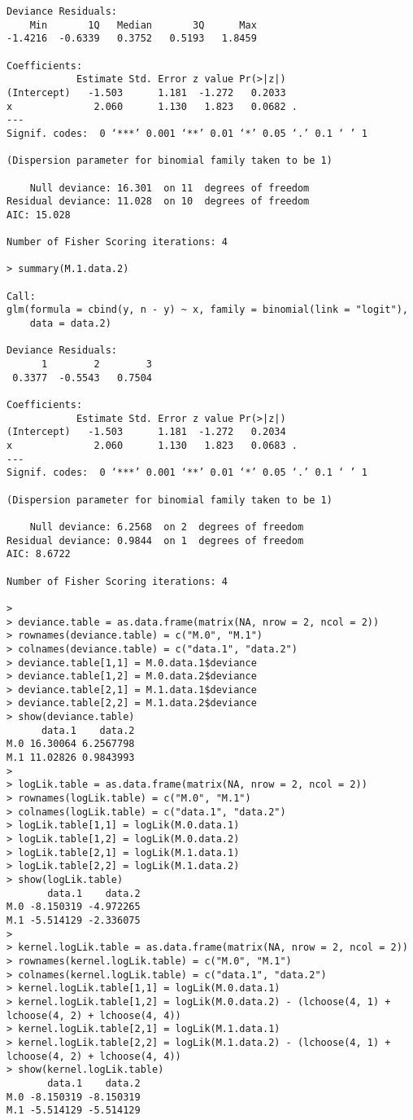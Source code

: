 \documentclass[a4paper]{article}
\begin{document}
\begin{lstlisting}
Deviance Residuals: 
    Min       1Q   Median       3Q      Max  
-1.4216  -0.6339   0.3752   0.5193   1.8459  

Coefficients:
            Estimate Std. Error z value Pr(>|z|)  
(Intercept)   -1.503      1.181  -1.272   0.2033  
x              2.060      1.130   1.823   0.0682 .
---
Signif. codes:  0 ‘***’ 0.001 ‘**’ 0.01 ‘*’ 0.05 ‘.’ 0.1 ‘ ’ 1

(Dispersion parameter for binomial family taken to be 1)

    Null deviance: 16.301  on 11  degrees of freedom
Residual deviance: 11.028  on 10  degrees of freedom
AIC: 15.028

Number of Fisher Scoring iterations: 4

> summary(M.1.data.2)

Call:
glm(formula = cbind(y, n - y) ~ x, family = binomial(link = "logit"), 
    data = data.2)

Deviance Residuals: 
      1        2        3  
 0.3377  -0.5543   0.7504  

Coefficients:
            Estimate Std. Error z value Pr(>|z|)  
(Intercept)   -1.503      1.181  -1.272   0.2034  
x              2.060      1.130   1.823   0.0683 .
---
Signif. codes:  0 ‘***’ 0.001 ‘**’ 0.01 ‘*’ 0.05 ‘.’ 0.1 ‘ ’ 1

(Dispersion parameter for binomial family taken to be 1)

    Null deviance: 6.2568  on 2  degrees of freedom
Residual deviance: 0.9844  on 1  degrees of freedom
AIC: 8.6722

Number of Fisher Scoring iterations: 4

> 
> deviance.table = as.data.frame(matrix(NA, nrow = 2, ncol = 2))
> rownames(deviance.table) = c("M.0", "M.1")
> colnames(deviance.table) = c("data.1", "data.2")
> deviance.table[1,1] = M.0.data.1$deviance
> deviance.table[1,2] = M.0.data.2$deviance
> deviance.table[2,1] = M.1.data.1$deviance
> deviance.table[2,2] = M.1.data.2$deviance
> show(deviance.table)
      data.1    data.2
M.0 16.30064 6.2567798
M.1 11.02826 0.9843993
> 
> logLik.table = as.data.frame(matrix(NA, nrow = 2, ncol = 2))
> rownames(logLik.table) = c("M.0", "M.1")
> colnames(logLik.table) = c("data.1", "data.2")
> logLik.table[1,1] = logLik(M.0.data.1)
> logLik.table[1,2] = logLik(M.0.data.2)
> logLik.table[2,1] = logLik(M.1.data.1) 
> logLik.table[2,2] = logLik(M.1.data.2)
> show(logLik.table)
       data.1    data.2
M.0 -8.150319 -4.972265
M.1 -5.514129 -2.336075
> 
> kernel.logLik.table = as.data.frame(matrix(NA, nrow = 2, ncol = 2))
> rownames(kernel.logLik.table) = c("M.0", "M.1")
> colnames(kernel.logLik.table) = c("data.1", "data.2")
> kernel.logLik.table[1,1] = logLik(M.0.data.1)
> kernel.logLik.table[1,2] = logLik(M.0.data.2) - (lchoose(4, 1) + lchoose(4, 2) + lchoose(4, 4))
> kernel.logLik.table[2,1] = logLik(M.1.data.1)
> kernel.logLik.table[2,2] = logLik(M.1.data.2) - (lchoose(4, 1) + lchoose(4, 2) + lchoose(4, 4))
> show(kernel.logLik.table)
       data.1    data.2
M.0 -8.150319 -8.150319
M.1 -5.514129 -5.514129
\end{lstlisting}
\end{document}
